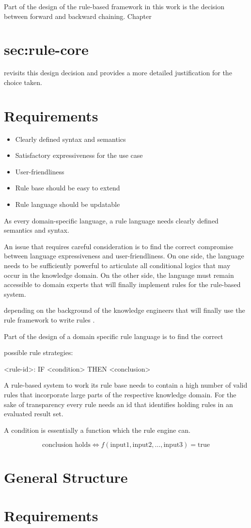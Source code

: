 Part of the design of the rule-based framework in this work is the decision between forward and backward chaining.
Chapter \section{sec:rule-core} revisits this design decision and provides a more detailed justification for the choice taken.


\section{Requirements}

\begin{itemize}
    \item Clearly defined syntax and semantics
    \item Satisfactory expressiveness for the use case
    \item User-friendliness
    \item Rule base should be easy to extend
    \item Rule language should be updatable
\end{itemize}

As every domain-specific language, a rule language needs clearly defined semantics and syntax.


An issue that requires careful consideration is to find the correct compromise between language expressiveness and user-friendliness\cite{https://doi.org/10.1002/widm.11}.
On one side, the language needs to be sufficiently powerful to articulate all conditional logics that may occur in the knowledge domain.
On the other side, the language must remain accessible to domain experts that will finally implement rules for the rule-based system.

depending on the background of the knowledge engineers that will finally use the rule framework to write rules .


Part of the design of a domain specific rule language is to find the correct



possible rule strategies:

<rule-id>: IF <condition> THEN <conclusion>

A rule-based system to work its rule base needs to contain a high number of valid rules that incorporate large parts of the respective knowledge domain.
For the sake of transparency every rule needs an id that identifies holding rules in an evaluated result set.

A condition is essentially a function which the rule engine can.

\[
    \text{conclusion holds} \Leftrightarrow f(\text{input1}, \text{input2}, \ldots, \text{input3}) = \text{true}
\]





\section{General Structure}




\section{Requirements}


